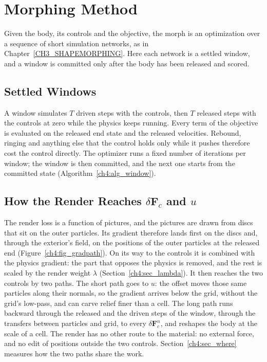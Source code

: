 \section{Morphing Method}
\label{ch4:sec_method}

Given the body, its controls and the objective, the morph is an optimization over a sequence of short simulation
networks, as in Chapter~\ref{CH3_SHAPEMORPHING}. Here each network is a settled window, and a window is committed only
after the body has been released and scored.

\subsection{Settled Windows}
A window simulates $T$ driven steps with the controls, then $T$ released steps with the controls at zero while the
physics keeps running. Every term of the objective is evaluated on the released end state and the released velocities.
Rebound, ringing and anything else that the control holds only while it pushes therefore cost the control directly. The
optimizer runs a fixed number of iterations per window; the window is then committed, and the next one starts from the
committed state (Algorithm~\ref{ch4:alg_window}).

\subsection{How the Render Reaches $\delta\mathbf{F}_c$ and $u$}
\label{ch4:sec_gradpath}
The render loss is a function of pictures, and the pictures are drawn from discs that sit on the outer particles. Its
gradient therefore lands first on the discs and, through the exterior's field, on the positions of the outer particles at
the released end (Figure~\ref{ch4:fig_gradpath}). On its way to the controls it is combined with the physics gradient: the
part that opposes the physics is removed, and the rest is scaled by the render weight $\lambda$
(Section~\ref{ch4:sec_lambda}). It then reaches the two controls by two paths. The short path goes to $u$: the offset
moves those same particles along their normals, so the gradient arrives below the grid, without the grid's low-pass, and
can carve relief finer than a cell. The long path runs backward through the released and the driven steps of the window,
through the transfers between particles and grid, to every $\delta\mathbf{F}^n_c$, and reshapes the body at the scale of a
cell. The render has no other route to the material: no external force, and no edit of positions outside the two
controls. Section~\ref{ch4:sec_where} measures how the two paths share the work.


